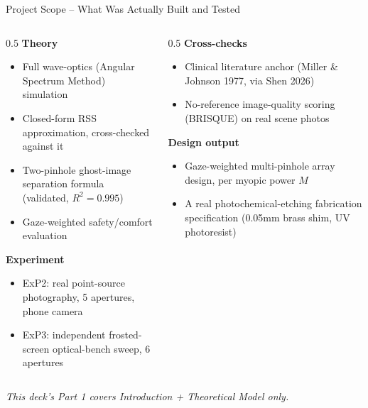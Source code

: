 \documentclass[aspectratio=169]{beamer}
\begin{document}
\begin{frame}{Project Scope -- What Was Actually Built and Tested}
  \begin{columns}
    \begin{column}{0.5\textwidth}
      \textbf{Theory}
      \begin{itemize}
        \item Full wave-optics (Angular Spectrum Method) simulation
        \item Closed-form RSS approximation, cross-checked against it
        \item Two-pinhole ghost-image separation formula (validated, $R^2=0.995$)
        \item Gaze-weighted safety/comfort evaluation
      \end{itemize}
      \textbf{Experiment}
      \begin{itemize}
        \item ExP2: real point-source photography, 5 apertures, phone camera
        \item ExP3: independent frosted-screen optical-bench sweep, 6 apertures
      \end{itemize}
    \end{column}
    \begin{column}{0.5\textwidth}
      \textbf{Cross-checks}
      \begin{itemize}
        \item Clinical literature anchor (Miller \& Johnson 1977, via Shen 2026)
        \item No-reference image-quality scoring (BRISQUE) on real scene photos
      \end{itemize}
      \textbf{Design output}
      \begin{itemize}
        \item Gaze-weighted multi-pinhole array design, per myopic power $M$
        \item A real photochemical-etching fabrication specification (0.05mm brass
          shim, UV photoresist)
      \end{itemize}
    \end{column}
  \end{columns}
  \vspace{0.2cm}
  \small\textit{This deck's Part 1 covers Introduction + Theoretical Model only.}
\end{frame}
\end{document}
